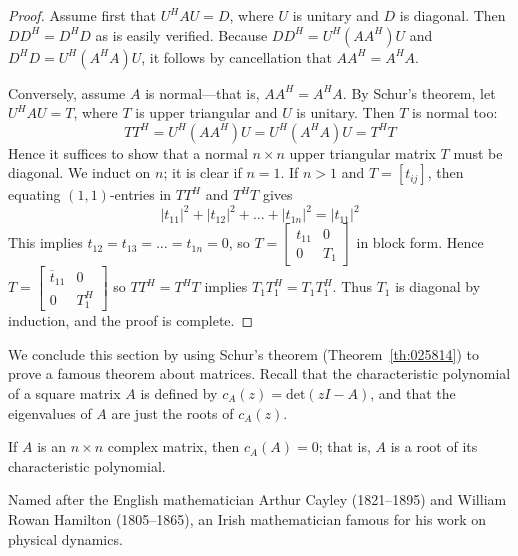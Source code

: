 \documentclass{ximera}
\begin{document}
\begin{proof}
Assume first that $U^{H}AU = D$, where $U$ is unitary and $D$ is diagonal. Then $DD^{H} = D^{H}D$ as is easily verified. Because $DD^{H} = U^{H}(AA^{H})U$ and $D^{H}D = U^{H}(A^{H}A)U$, it follows by cancellation that $AA^{H} = A^{H}A$.

Conversely, assume $A$ is normal---that is, $AA^{H} = A^{H}A$. By Schur's theorem, let $U^{H}AU = T$, where $T$ is upper triangular and $U$ is unitary. Then $T$ is normal too:
\begin{equation*}
TT^H = U^H(AA^H)U = U^H(A^HA)U = T^HT
\end{equation*}
Hence it suffices to show that a normal $n \times n$ upper triangular matrix $T$ must be diagonal. We induct on $n$; it is clear if $n = 1$. If $n > 1$ and $T = \left[ t_{ij} \right]$, then equating $(1, 1)$-entries in $TT^{H}$ and $T^{H}T$ gives
\begin{equation*}
|t_{11}|^2 + |t_{12}|^2 + \ldots + |t_{1n}|^2 = |t_{11}|^2
\end{equation*}
This implies $t_{12} = t_{13} = \ldots = t_{1n} = 0$, so $T = \left[ \begin{array}{cc}
t_{11} & 0 \\
0 & T_{1}
\end{array}\right]$ in block form. Hence $T = \left[ \begin{array}{cc}
\overline{t}_{11} & 0 \\
0 & T_{1}^H
\end{array}\right]$ so $TT^{H} = T^{H}T$ implies $T_{1}T_{1}^H = T_{1}T_{1}^H$. Thus $T_{1}$ is diagonal by induction, and the proof is complete.
\end{proof}

We conclude this section by using Schur's theorem (Theorem~\ref{th:025814}) to prove a famous theorem about matrices. Recall that the characteristic polynomial of a square matrix $A$ is defined by $c_{A}(z) = \mbox{det}(zI - A)$, and that the eigenvalues of $A$ are just the roots of $c_{A}(z)$.

\begin{theorem}\label{th:Cayley_Hamilton}
If $A$ is an $n \times n$ complex matrix, then $c_{A}(A) = 0$; that is, $A$ is a root of its characteristic polynomial.
\end{theorem}
\begin{remark}
Named after the English mathematician Arthur Cayley (1821--1895) and William Rowan Hamilton (1805--1865), an Irish mathematician famous for his work on physical dynamics.
\end{remark}
\end{document}
